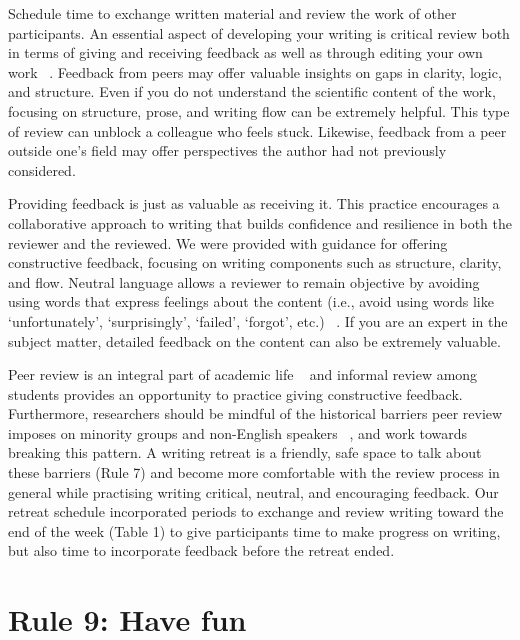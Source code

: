 \documentclass[10pt,letterpaper]{article}
\begin{document}
Schedule time to exchange written material and review the work of other participants. An essential aspect of developing your writing is critical review both in terms of giving and receiving feedback as well as through editing your own work ~\cite{guilford2001, reynolds2011}. Feedback from peers may offer valuable insights on gaps in clarity, logic, and structure. Even if you do not understand the scientific content of the work, focusing on structure, prose, and writing flow can be extremely helpful. This type of review can unblock a colleague who feels stuck. Likewise, feedback from a peer outside one's field may offer perspectives the author had not previously considered.

Providing feedback is just as valuable as receiving it. This practice encourages a collaborative approach to writing that builds confidence and resilience in both the reviewer and the reviewed. We were provided with guidance for offering constructive feedback, focusing on writing components such as structure, clarity, and flow. Neutral language allows a reviewer to remain objective by avoiding using words that express feelings about the content (i.e., avoid using words like `unfortunately', `surprisingly', `failed', `forgot', etc.) ~\cite{parsons2021}. If you are an expert in the subject matter, detailed feedback on the content can also be extremely valuable. 

Peer review is an integral part of academic life ~\cite{borja2024} and informal review among students provides an opportunity to practice giving constructive feedback. Furthermore, researchers should be mindful of the historical barriers peer review imposes on minority groups and non-English speakers ~\cite{smith2023, saleh2024}, and work towards breaking this pattern. A writing retreat is a friendly, safe space to talk about these barriers (Rule 7) and become more comfortable with the review process in general while practising writing critical, neutral, and encouraging feedback. Our retreat schedule incorporated periods to exchange and review writing toward the end of the week (Table 1) to give participants time to make progress on writing, but also time to incorporate feedback before the retreat ended.

\section*{Rule 9: Have fun}
\end{document}
